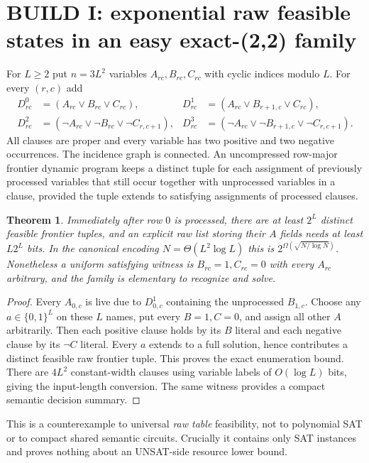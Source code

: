 \documentclass[11pt]{article}
\newtheorem{theorem}{Theorem}
\begin{document}
\section{BUILD I: exponential raw feasible states in an easy exact-(2,2) family}
For $L\ge2$ put $n=3L^2$ variables $A_{rc},B_{rc},C_{rc}$ with cyclic indices modulo $L$. For every $(r,c)$ add
\begin{align*}
D^0_{rc}&=(A_{rc}\vee B_{rc}\vee C_{rc}),&
D^1_{rc}&=(A_{rc}\vee B_{r+1,c}\vee C_{rc}),\\
D^2_{rc}&=(\neg A_{rc}\vee\neg B_{rc}\vee\neg C_{r,c+1}),&
D^3_{rc}&=(\neg A_{rc}\vee\neg B_{r+1,c}\vee\neg C_{r,c+1}).
\end{align*}
All clauses are proper and every variable has two positive and two negative occurrences. The incidence graph is connected. An uncompressed row-major frontier dynamic program keeps a distinct tuple for each assignment of previously processed variables that still occur together with unprocessed variables in a clause, provided the tuple extends to satisfying assignments of processed clauses.
\begin{theorem}
Immediately after row $0$ is processed, there are at least $2^L$ distinct feasible frontier tuples, and an explicit raw list storing their $A$ fields needs at least $L2^L$ bits. In the canonical encoding $N=\Theta(L^2\log L)$ this is $2^{\Omega(\sqrt{N/\log N})}$. Nonetheless a uniform satisfying witness is $B_{rc}=1,C_{rc}=0$ with every $A_{rc}$ arbitrary, and the family is elementary to recognize and solve.
\end{theorem}
\begin{proof}
Every $A_{0,c}$ is live due to $D^1_{0,c}$ containing the unprocessed $B_{1,c}$. Choose any $a\in\{0,1\}^L$ on these $L$ names, put every $B=1,C=0$, and assign all other $A$ arbitrarily. Then each positive clause holds by its $B$ literal and each negative clause by its $\neg C$ literal. Every $a$ extends to a full solution, hence contributes a distinct feasible raw frontier tuple. This proves the exact enumeration bound. There are $4L^2$ constant-width clauses using variable labels of $O(\log L)$ bits, giving the input-length conversion. The same witness provides a compact semantic decision summary.
\end{proof}
This is a counterexample to universal \emph{raw table} feasibility, not to polynomial SAT or to compact shared semantic circuits. Crucially it contains only SAT instances and proves nothing about an UNSAT-side resource lower bound.
\end{document}
